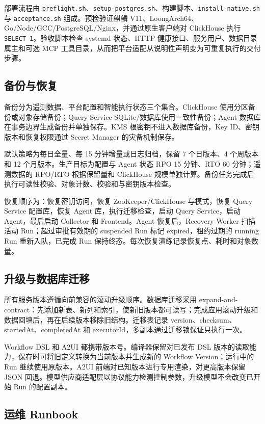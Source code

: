 \documentclass[conference,10pt]{IEEEtran}
\newcommand{\code}[1]{\texttt{#1}}
\begin{document}
部署流程由 \code{preflight.sh}、\code{setup-postgres.sh}、构建脚本、\code{install-native.sh} 与 \code{acceptance.sh} 组成。预检验证麒麟 V11、LoongArch64、Go/Node/GCC/PostgreSQL/Nginx，并通过原生客户端对 ClickHouse 执行 \code{SELECT 1}。验收脚本检查 systemd 状态、HTTP 健康接口、服务用户、数据目录属主和可选 MCP 工具目录，从而把平台适配从说明性声明变为可重复执行的交付步骤。

\subsection{备份与恢复}

备份分为遥测数据、平台配置和智能执行状态三个集合。ClickHouse 使用分区备份或对象存储备份；Query Service SQLite/数据库使用一致性备份；Agent 数据库在事务边界生成备份并单独保存。KMS 根密钥不进入数据库备份，Key ID、密钥版本和恢复权限通过 Secret Manager 的灾备机制保存。

默认策略为每日全量、每 15 分钟增量或日志归档，保留 7 个日版本、4 个周版本和 12 个月版本。生产目标为配置与 Agent 状态 RPO 15 分钟、RTO 60 分钟；遥测数据的 RPO/RTO 根据保留量和 ClickHouse 规模单独计算。备份任务完成后执行可读性校验、对象计数、校验和与密钥版本检查。

恢复顺序为：恢复密钥访问，恢复 ZooKeeper/ClickHouse 与模式，恢复 Query Service 配置库，恢复 Agent 库，执行迁移检查，启动 Query Service，启动 Agent，最后启动 Collector 和 Frontend。Agent 恢复后，Recovery Worker 扫描活动 Run；超过审批有效期的 suspended Run 标记 expired，租约过期的 running Run 重新入队，已完成 Run 保持终态。每次恢复演练记录恢复点、耗时和对象数量。

\subsection{升级与数据库迁移}

所有服务版本遵循向前兼容的滚动升级顺序。数据库迁移采用 expand-and-contract：先添加新表、新列和索引，使新旧版本都可读写；完成应用滚动升级和数据回填后，再在后续版本移除旧结构。迁移表记录 version、checksum、startedAt、completedAt 和 executorId，多副本通过迁移锁保证只执行一次。

Workflow DSL 和 A2UI 都携带版本号。编译器保留对已发布 DSL 版本的读取能力，保存时可将旧定义转换为当前版本并生成新的 Workflow Version；运行中的 Run 继续使用原版本。A2UI 前端对已知版本进行专用渲染，对更高版本保留 JSON 回退。模型供应商适配层以协议能力检测控制参数，升级模型不会改变已开始 Run 的配置副本。

\subsection{运维 Runbook}
\end{document}
